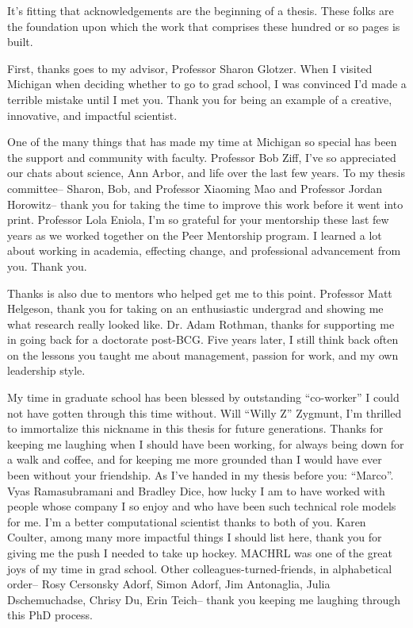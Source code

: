 It's fitting that acknowledgements are the beginning of a thesis.
These folks are the foundation upon which the work that comprises these hundred or so pages is built.

First, thanks goes to my advisor, Professor Sharon Glotzer. When I visited Michigan when deciding whether to go to grad school, I was convinced I'd made a terrible mistake until I met you. Thank you for being an example of a creative, innovative, and impactful scientist.

One of the many things that has made my time at Michigan so special has been the support and community with faculty.
Professor Bob Ziff, I've so appreciated our chats about science, Ann Arbor, and life over the last few years.
To my thesis committee-- Sharon, Bob, and Professor Xiaoming Mao and Professor Jordan Horowitz-- thank you for taking the time to improve this work before it went into print.
Professor Lola Eniola, I'm so grateful for your mentorship these last few years as we worked together on the Peer Mentorship program. I learned a lot about working in academia, effecting change, and professional advancement from you. Thank you.

Thanks is also due to mentors who helped get me to this point.
Professor Matt Helgeson, thank you for taking on an enthusiastic undergrad and showing me what research really looked like.
Dr. Adam Rothman, thanks for supporting me in going back for a doctorate post-BCG. Five years later, I still think back often on the lessons you taught me about management, passion for work, and my own leadership style.

My time in graduate school has been blessed by outstanding ``co-worker'' I could not have gotten through this time without.
Will ``Willy Z'' Zygmunt, I'm thrilled to immortalize this nickname in this thesis for future generations. Thanks for keeping me laughing when I should have been working, for always being down for a walk and coffee, and for keeping me more grounded than I would have ever been without your friendship. As I've handed in my thesis before you: ``Marco''.
Vyas Ramasubramani and Bradley Dice, how lucky I am to have worked with people whose company I so enjoy and who have been such technical role models for me. I'm a better computational scientist thanks to both of you.
Karen Coulter, among many more impactful things I should list here, thank you for giving me the push I needed to take up hockey. MACHRL was one of the great joys of my time in grad school.
Other colleagues-turned-friends, in alphabetical order-- Rosy Cersonsky Adorf, Simon Adorf, Jim Antonaglia, Julia Dschemuchadse, Chrisy Du, Erin Teich-- thank you keeping me laughing through this PhD process.

